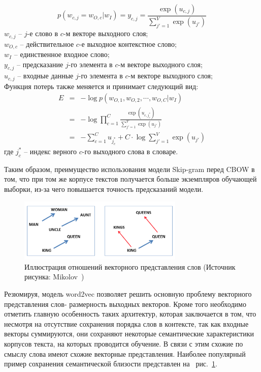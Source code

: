 \begin{equation}
p(w_{c,j} = w_{O,c} | w_I) = y_{c,j} = \frac{\exp(u_{c,j})}{\sum_{j'=1}^V\exp(u_{j'})}
\end{equation}
$w_{c,j}$ -- $j$-е слово в $c$-м векторе выходного слоя;\\
$w_{O,c}$  -- действительное $c$-е выходное контекстное слово; \\
$w_I$ -- единственное входное слово;\\
$y_{c,j}$ -- предсказание $j$-го элемента в $c$-м векторе выходного слоя;\\
$u_{c,j}$  -- входные данные $j$-го элемента в $c$-м векторе выходного слоя;\\


Функция потерь также меняется и принимает следующий вид:
\begin{eqnarray}
E &=& -\log p(w_{O,1}, w_{O,2}, \cdots, w_{O,C} | w_I) \\
&=& -\log \prod_{c=1}^C\frac{\exp(u_{c,j_c^*})}{\sum_{j'=1}^V\exp(u_{j'})} \\
&=& -\sum_{c=1}^C u_{j_c^*} + C\cdot\log\sum_{j'=1}^V\exp(u_{j'})
\end{eqnarray}
где  $j_c^*$ -- индекс верного $c$-го выходного слова в словаре.

Таким образом, преимущество использования модели Skip-gram перед CBOW в том, что при том же корпусе текстов получается больше экземпляров обучающей выборки, из-за чего повышается точность предсказаний модели.
\begin{figure}[t]%
\centering
\includegraphics[width=0.7\textwidth]{img/w2v-semantic.png}
\caption{\label{fig:w2v-semantic}Иллюстрация отношений векторного представления слов (Источник рисунка: Mikolov~\autocite{mikolov-etal-2013-linguistic})}
\end{figure}
Резюмируя, модель word2vec позволяет решить основную проблему векторного представления слов- размерность выходных векторов. Кроме того необходимо отметить главную особенность таких архитектур, которая заключается в том, что несмотря на отсутствие сохранения порядка слов в контексте, так как входные векторы суммируются, они сохраняют некоторые семантические характеристики корпусов текста, на которых проводится обучение. В связи с этим схожие по смыслу слова имеют схожие векторные представления. Наиболее популярный пример сохранения семантической близости представлен на ~рис.~\ref{fig:w2v-semantic}.


